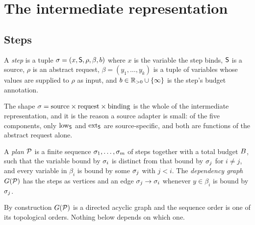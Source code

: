 \section{The intermediate representation}
\label{sec:ir}

\subsection{Steps}

\begin{definition}[Step]
\label{def:step}
A \emph{step} is a tuple
$\sigma = (x, \mathsf{S}, \rho, \beta, b)$
where $x$ is the variable the step binds, $\mathsf{S}$ is a source, $\rho$ is an
abstract request, $\beta = (y_1,\dots,y_k)$ is a tuple of variables whose
values are supplied to $\rho$ as input, and $b \in \mathbb{R}_{>0} \cup \{\infty\}$
is the step's budget annotation.
\end{definition}

The shape $\sigma = \text{source} \times \text{request} \times \text{binding}$
is the whole of the intermediate representation, and it is the reason a source
adapter is small: of the five components, only $\mathrm{low}_{\mathsf{S}}$ and $\mathrm{ext}_{\mathsf{S}}$ are
source-specific, and both are functions of the abstract request alone.

\begin{definition}[Plan]
\label{def:plan}
A \emph{plan} $\mathcal{P}$ is a finite sequence $\sigma_1,\dots,\sigma_m$ of steps
together with a total budget $B$, such that the variable bound by $\sigma_i$
is distinct from that bound by $\sigma_j$ for $i \neq j$, and every variable in
$\beta_i$ is bound by some $\sigma_j$ with $j < i$. The \emph{dependency graph}
$G(\mathcal{P})$ has the steps as vertices and an edge $\sigma_j \to \sigma_i$ whenever
$y \in \beta_i$ is bound by $\sigma_j$.
\end{definition}

By construction $G(\mathcal{P})$ is a directed acyclic graph and the sequence order
is one of its topological orders. Nothing below depends on which one.

